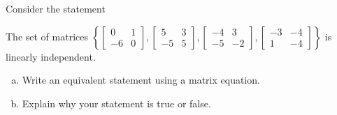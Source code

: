 
\begin{exerciseStatement}


Consider the statement 
\begin{center}\begin{minipage}{0.8\textwidth}
 The set of matrices \( \left\{ \left[\begin{array}{cc}
0 & 1 \\
-6 & 0
\end{array}\right] , \left[\begin{array}{cc}
5 & 3 \\
-5 & 5
\end{array}\right] , \left[\begin{array}{cc}
-4 & 3 \\
-5 & -2
\end{array}\right] , \left[\begin{array}{cc}
-3 & -4 \\
1 & -4
\end{array}\right] \right\} \) is linearly independent.
\end{minipage}\end{center}
    


\begin{enumerate}[(a)]
\item  Write an equivalent statement using a matrix equation.
\item  Explain why your statement is true or false.
\end{enumerate}
    
\end{exerciseStatement}
    
